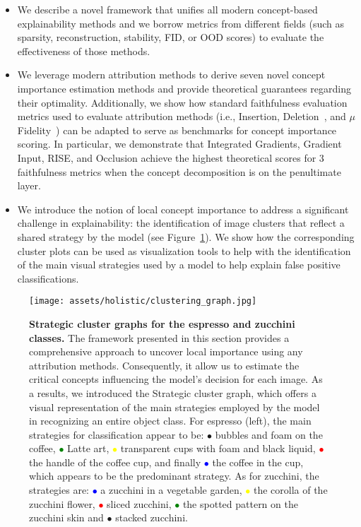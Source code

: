 \begin{itemize}
    \item We describe a novel framework that unifies all modern concept-based explainability methods and we borrow metrics from different fields (such as sparsity, reconstruction, stability, FID, or OOD scores) to evaluate the effectiveness of those methods. 
    \item We leverage modern attribution methods to derive seven novel concept importance estimation methods and provide theoretical guarantees regarding their optimality. 
    Additionally, we show how standard faithfulness evaluation metrics used to evaluate attribution methods (i.e., Insertion, Deletion~\cite{petsiuk2018rise}, and $\mu$Fidelity~\cite{aggregating2020}) can be adapted to serve as benchmarks for concept importance scoring.
    In particular, we demonstrate that Integrated Gradients, Gradient Input, RISE, and Occlusion achieve the highest theoretical scores for 3 faithfulness metrics when the concept decomposition is on the penultimate layer. 
    \item We introduce the notion of local concept importance to address a significant challenge in explainability: the identification of image clusters that reflect a shared strategy by the model (see Figure~\ref{fig:holistic:clustering_graph}). We show how the corresponding cluster plots can be used as visualization tools to help with the identification of the main visual strategies used by a model to help explain false positive classifications. 
\end{itemize}



\begin{figure}[ht]
\begin{center}
   \texttt{[image: assets/holistic/clustering\_graph.jpg]}
\end{center}
   \caption{\textbf{Strategic cluster graphs for the espresso and zucchini classes.}
    The framework presented in this section provides a comprehensive approach to uncover local importance using any attribution methods. 
    Consequently, it allow us to estimate the critical concepts influencing the model's decision for each image.
    As a results, we introduced the Strategic cluster graph, which offers a visual representation of the main strategies employed by the model in recognizing an entire object class.
    For espresso (left), the main strategies for classification appear to be: \textcolor{anthracite}{$\bullet$} bubbles and foam on the coffee, \textcolor{green}{$\bullet$} Latte art, \textcolor{yellow}{$\bullet$} transparent cups with foam and black liquid, \textcolor{red}{$\bullet$} the handle of the coffee cup, and finally \textcolor{blue}{$\bullet$} the coffee in the cup, which appears to be the predominant strategy.
    As for zucchini, the strategies are: \textcolor{blue}{$\bullet$} a zucchini in a vegetable garden, \textcolor{yellow}{$\bullet$} the corolla of the zucchini flower, \textcolor{red}{$\bullet$} sliced zucchini, \textcolor{green}{$\bullet$} the spotted pattern on the zucchini skin and \textcolor{anthracite}{$\bullet$} stacked zucchini.
   }
\label{fig:holistic:clustering_graph}
\end{figure}

